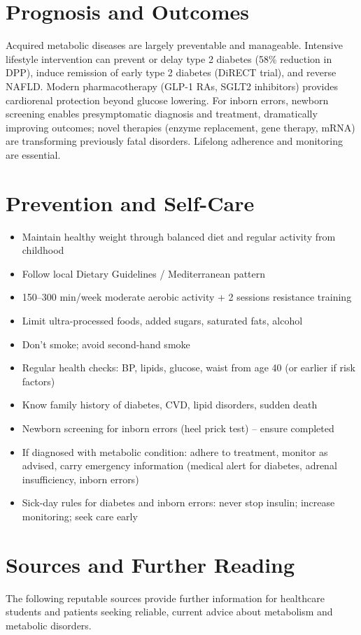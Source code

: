 \section*{Prognosis and Outcomes}
Acquired metabolic diseases are largely preventable and manageable. Intensive lifestyle intervention can prevent or delay type 2 diabetes (58\% reduction in DPP), induce remission of early type 2 diabetes (DiRECT trial), and reverse NAFLD. Modern pharmacotherapy (GLP-1 RAs, SGLT2 inhibitors) provides cardiorenal protection beyond glucose lowering. For inborn errors, newborn screening enables presymptomatic diagnosis and treatment, dramatically improving outcomes; novel therapies (enzyme replacement, gene therapy, mRNA) are transforming previously fatal disorders. Lifelong adherence and monitoring are essential.

\section*{Prevention and Self-Care}
\begin{itemize}
    \item Maintain healthy weight through balanced diet and regular activity from childhood
    \item Follow local Dietary Guidelines / Mediterranean pattern
    \item 150--300 min/week moderate aerobic activity + 2 sessions resistance training
    \item Limit ultra-processed foods, added sugars, saturated fats, alcohol
    \item Don't smoke; avoid second-hand smoke
    \item Regular health checks: BP, lipids, glucose, waist from age 40 (or earlier if risk factors)
    \item Know family history of diabetes, CVD, lipid disorders, sudden death
    \item Newborn screening for inborn errors (heel prick test) -- ensure completed
    \item If diagnosed with metabolic condition: adhere to treatment, monitor as advised, carry emergency information (medical alert for diabetes, adrenal insufficiency, inborn errors)
    \item Sick-day rules for diabetes and inborn errors: never stop insulin; increase monitoring; seek care early
\end{itemize}

\section*{Sources and Further Reading}
The following reputable sources provide further information for healthcare students and patients seeking reliable, current advice about metabolism and metabolic disorders.

